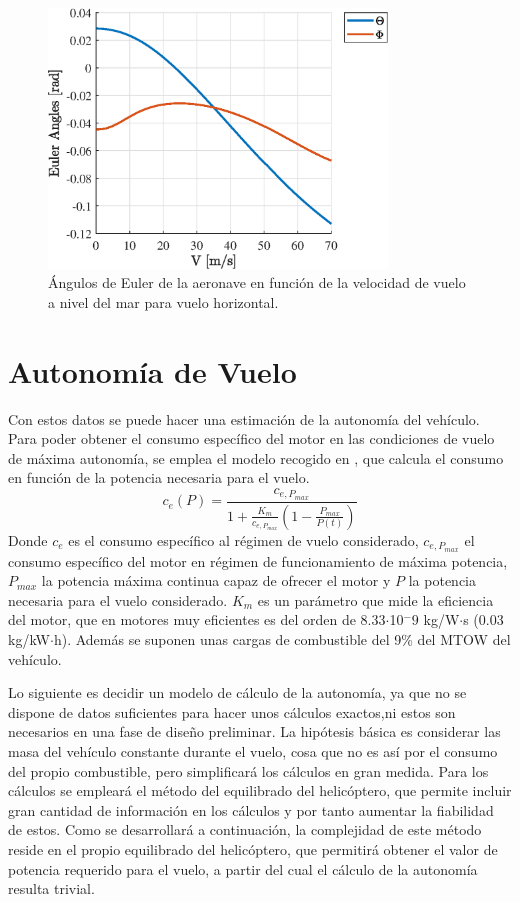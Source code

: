 \begin{figure}
	\centering
	\includegraphics[width=90mm]{graficos/EulerVH}
	\caption{Ángulos de Euler de la aeronave en función de la velocidad de vuelo a nivel del mar para vuelo horizontal.}
	\label{EulerVH}
\end{figure}

\section{Autonomía de Vuelo}

Con estos datos se puede hacer una estimación de la autonomía del vehículo. 
Para poder obtener el consumo específico del motor en las condiciones de vuelo de máxima autonomía, se emplea el modelo recogido en \citet{Cuerva}, que calcula el consumo en función de la potencia necesaria para el vuelo.
\begin{equation}
	c_e(P)=\frac{c_{e,P_{max}}}{1+\frac{K_m}{c_{e,P_{max}}}(1-\frac{P_{max}}{P(t)})}
	\label{consumo}
\end{equation}
Donde $c_e$ es el consumo específico al régimen de vuelo considerado, $c_{e,P_{max}}$ el consumo específico del motor en régimen de funcionamiento de máxima potencia, $P_{max}$ la potencia máxima continua capaz de ofrecer el motor y $P$ la potencia necesaria para el vuelo considerado.
$K_m$ es un parámetro que mide la eficiencia del motor, que en motores muy eficientes es del orden de 8.33$\cdot$10$^-9$ kg/W$\cdot$s (0.03 kg/kW$\cdot$h).
Además se suponen unas cargas de combustible del 9\% del MTOW del vehículo. 

Lo siguiente es decidir un modelo de cálculo de la autonomía, ya que no se dispone de datos suficientes para hacer unos cálculos exactos,ni estos son necesarios en una fase de diseño preliminar. La hipótesis básica es considerar las masa del vehículo constante durante el vuelo, cosa que no es así por el consumo del propio combustible, pero simplificará los cálculos en gran medida.
Para los cálculos se empleará el método del equilibrado del helicóptero, que permite incluir gran cantidad de información en los cálculos y por tanto aumentar la fiabilidad de estos. Como se desarrollará a continuación, la complejidad de este método reside en el propio equilibrado del helicóptero, que permitirá obtener el valor de potencia requerido para el vuelo, a partir del cual el cálculo de la autonomía resulta trivial.

